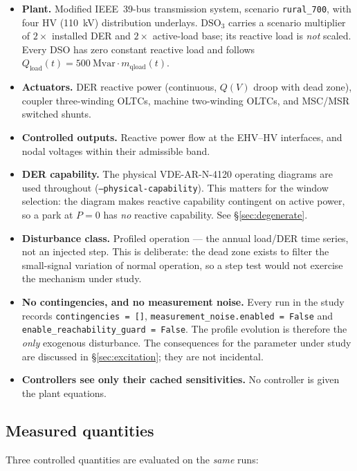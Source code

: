 \documentclass[11pt,a4paper]{article}
\newcommand{\Mvar}{\ensuremath{\mathrm{Mvar}}}
\begin{document}
\begin{itemize}
  \item \textbf{Plant.} Modified IEEE~39-bus transmission system, scenario
    \texttt{rural\_700}, with four HV (\SI{110}{\kilo\volt}) distribution
    underlays. $\mathrm{DSO}_3$ carries a scenario multiplier of $2\times$
    installed DER and $2\times$ active-load base; its reactive load is
    \emph{not} scaled. Every DSO has zero constant reactive load and follows
    $Q_\mathrm{load}(t) = \SI{500}{\Mvar}\cdot m_\mathrm{qload}(t)$.
  \item \textbf{Actuators.} DER reactive power (continuous, $Q(V)$ droop with
    dead zone), coupler three-winding OLTCs, machine two-winding OLTCs, and
    MSC/MSR switched shunts.
  \item \textbf{Controlled outputs.} Reactive power flow at the EHV--HV
    interfaces, and nodal voltages within their admissible band.
  \item \textbf{DER capability.} The physical VDE-AR-N-4120 operating diagrams
    are used throughout (\texttt{--physical-capability}). This matters for the
    window selection: the diagram makes reactive capability contingent on
    active power, so a park at $P=0$ has \emph{no} reactive capability. See
    \S\ref{sec:degenerate}.
  \item \textbf{Disturbance class.} Profiled operation --- the annual
    load/DER time series, not an injected step. This is deliberate: the dead
    zone exists to filter the small-signal variation of normal operation, so a
    step test would not exercise the mechanism under study.
  \item \textbf{No contingencies, and no measurement noise.} Every run in the
    study records \texttt{contingencies = []},
    \texttt{measurement\_noise.enabled = False} and
    \texttt{enable\_reachability\_guard = False}. The profile evolution is
    therefore the \emph{only} exogenous disturbance. The consequences for the
    parameter under study are discussed in \S\ref{sec:excitation}; they are not
    incidental.
  \item \textbf{Controllers see only their cached sensitivities.} No controller
    is given the plant equations.
\end{itemize}

\subsection{Measured quantities}

Three controlled quantities are evaluated on the \emph{same} runs:
\end{document}
